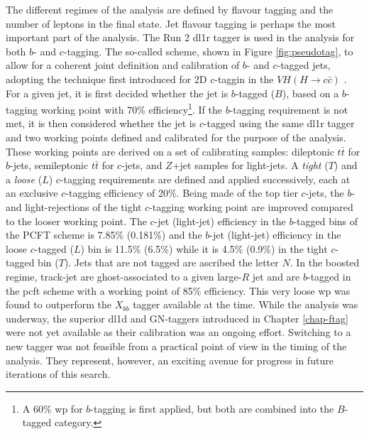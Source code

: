 The different regimes of the analysis are defined by flavour tagging and the number of leptons in the final state. Jet flavour tagging is perhaps the most important part of the analysis. The Run 2 \gls{dl1r} tagger is used in the analysis for both $b$- and $c$-tagging. The so-called  scheme, shown in Figure \ref{fig:pseudotag}, to allow for a coherent joint definition and calibration of $b$- and $c$-tagged jets, adopting the technique first introduced for 2D $c$-taggin in the $VH(H\rightarrow c\bar{c})$ \cite{Collaboration:2721696}. For a given jet, it is first decided whether the jet is $b$-tagged ($B$), based on a $b$-tagging working point with 70\% efficiency\footnote{A 60\% \gls{wp} for $b$-tagging is first applied, but both are combined into the $B$-tagged category.}. If the $b$-tagging requirement is not met, it is then considered whether the jet is $c$-tagged using the same \gls{dl1r} tagger and two working points defined and calibrated for the purpose of the analysis. These working points are derived on a set of calibrating samples: dileptonic $t\bar{t}$ for $b$-jets, semileptonic $t\bar{t}$ for $c$-jets, and $Z$+jet samples for light-jets. A \textit{tight} ($T$) and a \textit{loose} ($L$) $c$-tagging requirements are defined and applied successively, each at an exclusive $c$-tagging efficiency of 20\%. Being made of the top tier $c$-jets, the $b$- and light-rejections of the tight $c$-tagging working point are improved compared to the looser working point. The $c$-jet (light-jet) efficiency in the $b$-tagged bins of the PCFT scheme is 7.85\% (0.181\%) and the $b$-jet (light-jet) efficiency in the loose $c$-tagged ($L$) bin is 11.5\% (6.5\%) while it is 4.5\% (0.9\%) in the tight $c$-tagged bin ($T$). Jets that are not tagged are ascribed the letter $N$. In the boosted regime, track-jet are ghost-associated to a given large-$R$ jet and are $b$-tagged in the \gls{pcft} scheme with a working point of 85\% efficiency. This very loose \gls{wp} was found to outperform the $X_{bb}$ tagger available at the time. While the analysis was underway, the superior \gls{dl1d} and GN-taggers introduced in Chapter \ref{chap-ftag} were not yet available as their calibration was an ongoing effort. Switching to a new tagger was not feasible from a practical point of view in the timing of the analysis. They represent, however, an exciting avenue for progress in future iterations of this search. \\ %

